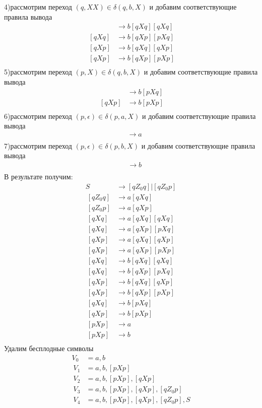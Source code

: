 \documentclass[a4paper,12pt]{article}
\begin{document}
4)рассмотрим переход $(q,XX)\in \delta(q,b,X)$ и добавим соответствующие правила вывода
\begin{align*}
	[qXq]&\to b[qXq][qXq]\\\
	[qXq]&\to b[qXp][pXq]\\\
	[qXp]&\to b[qXq][qXp]\\\
	[qXp]&\to b[qXp][pXp]\\\
\end{align*}
5)рассмотрим переход $(p,X)\in \delta(q,b,X)$ и добавим соответствующие правила вывода
\begin{align*}
	[qXq]&\to b[pXq]\\\
	[qXp]&\to b[pXp]\\\
\end{align*}
6)рассмотрим переход $(p,\epsilon)\in \delta(p,a,X)$ и добавим соответствующие правила вывода
\begin{align*}
	[pXp]&\to a\\\
\end{align*}
7)рассмотрим переход $(p,\epsilon)\in \delta(p,b,X)$ и добавим соответствующие правила вывода
\begin{align*}
	[pXp]&\to b\\\
\end{align*}
В результате получим:\\
\begin{align*}
	S&\to [qZ_0q]|[qZ_0p]\\\		
	[qZ_0q]&\to a[qXq]\\\
	[qZ_0p]&\to a[qXp]\\\		
	[qXq]&\to a[qXq][qXq]\\\
	[qXq]&\to a[qXp][pXq]\\\
	[qXp]&\to a[qXq][qXp]\\\
	[qXp]&\to a[qXp][pXp]\\\		
	[qXq]&\to b[qXq][qXq]\\\
	[qXq]&\to b[qXp][pXq]\\\
	[qXp]&\to b[qXq][qXp]\\\
	[qXp]&\to b[qXp][pXp]\\\
	[qXq]&\to b[pXq]\\\
	[qXp]&\to b[pXp]\\\
	[pXp]&\to a\\\
	[pXp]&\to b\\\
\end{align*}
Удалим бесплодные символы
\begin{align*}
	V_0&=a,b\\\
	V_1&=a,b,[pXp]\\\
	V_2&=a,b,[pXp],[qXp]\\\
	V_3&=a,b,[pXp],[qXp],[qZ_0p]\\\
	V_4&=a,b,[pXp],[qXp],[qZ_0p],S\\\
\end{align*}
\end{document}
